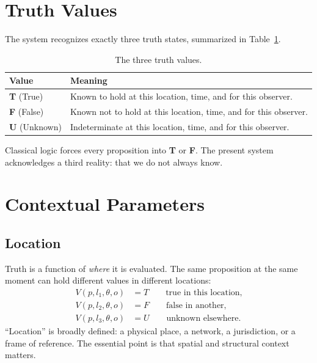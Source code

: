 \documentclass[11pt,a4paper]{article}
\begin{document}
\section{Truth Values}
The system recognizes exactly three truth states, summarized in
Table~\ref{tab:values}.

\begin{table}[h]
\centering
\caption{The three truth values.}
\label{tab:values}
\begin{tabular}{ll}
\toprule
\textbf{Value} & \textbf{Meaning} \\
\midrule
\textbf{T} (True)    & Known to hold at this location, time, and for this observer. \\
\textbf{F} (False)   & Known not to hold at this location, time, and for this observer. \\
\textbf{U} (Unknown) & Indeterminate at this location, time, and for this observer. \\
\bottomrule
\end{tabular}
\end{table}

Classical logic forces every proposition into \textbf{T} or \textbf{F}. The
present system acknowledges a third reality: that we do not always know.

\section{Contextual Parameters}

\subsection{Location}
Truth is a function of \emph{where} it is evaluated. The same proposition at
the same moment can hold different values in different locations:
\begin{align*}
V(p, l_1, \theta, o) &= T \qquad \text{true in this location,} \\
V(p, l_2, \theta, o) &= F \qquad \text{false in another,} \\
V(p, l_3, \theta, o) &= U \qquad \text{unknown elsewhere.}
\end{align*}
``Location'' is broadly defined: a physical place, a network, a jurisdiction,
or a frame of reference. The essential point is that spatial and structural
context matters.
\end{document}
